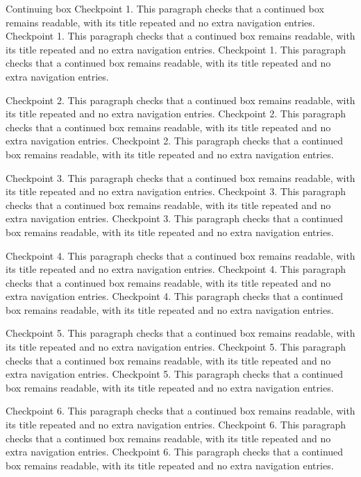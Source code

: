 \documentclass[algorithms,listings]{tempusreport}
\begin{document}
\begin{reportbox}{Continuing box}
Checkpoint 1. This paragraph checks that a continued box remains readable, with its title repeated and no extra navigation entries. Checkpoint 1. This paragraph checks that a continued box remains readable, with its title repeated and no extra navigation entries. Checkpoint 1. This paragraph checks that a continued box remains readable, with its title repeated and no extra navigation entries.

Checkpoint 2. This paragraph checks that a continued box remains readable, with its title repeated and no extra navigation entries. Checkpoint 2. This paragraph checks that a continued box remains readable, with its title repeated and no extra navigation entries. Checkpoint 2. This paragraph checks that a continued box remains readable, with its title repeated and no extra navigation entries.

Checkpoint 3. This paragraph checks that a continued box remains readable, with its title repeated and no extra navigation entries. Checkpoint 3. This paragraph checks that a continued box remains readable, with its title repeated and no extra navigation entries. Checkpoint 3. This paragraph checks that a continued box remains readable, with its title repeated and no extra navigation entries.

Checkpoint 4. This paragraph checks that a continued box remains readable, with its title repeated and no extra navigation entries. Checkpoint 4. This paragraph checks that a continued box remains readable, with its title repeated and no extra navigation entries. Checkpoint 4. This paragraph checks that a continued box remains readable, with its title repeated and no extra navigation entries.

Checkpoint 5. This paragraph checks that a continued box remains readable, with its title repeated and no extra navigation entries. Checkpoint 5. This paragraph checks that a continued box remains readable, with its title repeated and no extra navigation entries. Checkpoint 5. This paragraph checks that a continued box remains readable, with its title repeated and no extra navigation entries.

Checkpoint 6. This paragraph checks that a continued box remains readable, with its title repeated and no extra navigation entries. Checkpoint 6. This paragraph checks that a continued box remains readable, with its title repeated and no extra navigation entries. Checkpoint 6. This paragraph checks that a continued box remains readable, with its title repeated and no extra navigation entries.


\end{reportbox}
\end{document}

